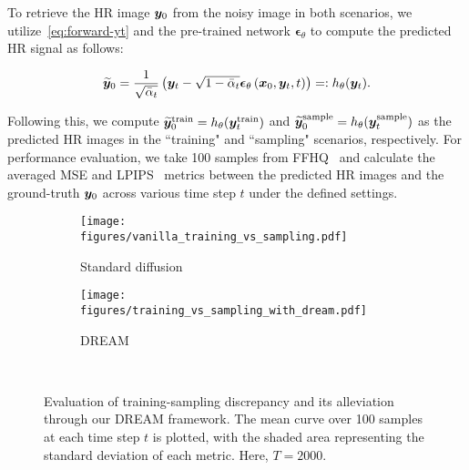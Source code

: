 To retrieve the HR image ${\bm{y}}_0$ from the noisy image in both scenarios, we utilize~\cref{eq:forward-yt} and the pre-trained network $\bm\epsilon_\theta$ to compute the predicted HR signal as follows:

\vspace{-.2in}
\begin{equation}
\small
\widetilde{\boldsymbol{y}}_0=\frac{1}{\sqrt{\bar{\alpha}_t}}\left(\boldsymbol{y}_t-\sqrt{1-\bar{\alpha}_t} \bm\epsilon_\theta\left(\boldsymbol{x}_0, \boldsymbol{y}_t, t\right)\right)=:h_\theta({\bm{y}}_t).
\label{eq:estimate_y0}
\end{equation}
\vspace{-.15in}

\noindent
Following this, we compute $\widetilde{{\bm{y}}}_0^{\text{train}}=h_\theta({\bm{y}}_t^{\text{train}})$ and $\widetilde{{\bm{y}}}_0^{\text{sample}}=h_\theta({\bm{y}}_t^{\text{sample}})$ as the predicted HR images in the ``training" and ``sampling" scenarios, respectively. For performance evaluation, we take 100 samples from FFHQ~\cite{karras2019style} and calculate the averaged MSE and LPIPS~\cite{zhang2018unreasonable} metrics between the predicted HR images and the ground-truth ${\bm{y}}_0$ across various time step $t$ under the defined settings.

\begin{figure} [t]
     \centering
     \begin{subfigure}[b]{0.23\textwidth}
         \centering
         \texttt{[image: figures/vanilla\_training\_vs\_sampling.pdf]}
         \caption{Standard diffusion}
         \label{fig:pixel-error-dynamic}
     \end{subfigure}
     \begin{subfigure}[b]{0.23\textwidth}
         \centering
         \texttt{[image: figures/training\_vs\_sampling\_with\_dream.pdf]}
         \caption{DREAM}
         \label{fig:latent-error-dynamic}
     \end{subfigure}\
     \vspace{-.1in}
         \caption{Evaluation of training-sampling discrepancy and its alleviation through our DREAM framework. The mean curve over 100 samples at each time step $t$ is plotted, with the shaded area representing the standard deviation of each metric.  Here, $T=2000$.}
        \label{fig:error-dynamic}
        \vspace{-.1in}
\end{figure}

